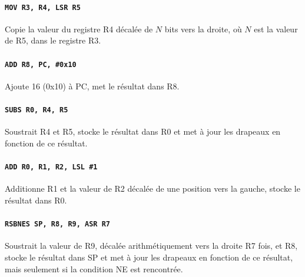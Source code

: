 \documentclass{tufte-handout}
\begin{document}
\paragraph{\texttt{MOV R3, R4, LSR R5}} Copie la valeur du registre R4 décalée de $N$ bits vers la droite, où $N$ est la valeur de R5, dans le registre R3.

\paragraph{\texttt{ADD R8, PC, \#0x10}} Ajoute 16 (0x10) à PC, met le résultat dans R8.
\paragraph{\texttt{SUBS R0, R4, R5}} Soustrait R4 et R5, stocke le résultat dans R0 et met à jour les drapeaux en fonction de ce résultat.
\paragraph{\texttt{ADD R0, R1, R2, LSL \#1}} Additionne R1 et la valeur de R2 décalée de une position vers la gauche, stocke le résultat dans R0.
\paragraph{\texttt{RSBNES SP, R8, R9, ASR R7}} Soustrait la valeur de R9, décalée arithmétiquement vers la droite R7 fois, et R8, stocke le résultat dans SP et met à jour les drapeaux en fonction de ce résultat, mais seulement si la condition NE est rencontrée.
\end{document}
